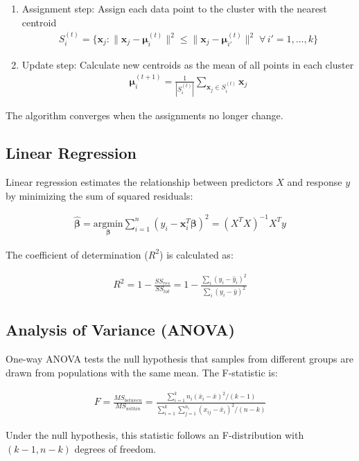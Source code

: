 \documentclass[12pt]{article}
\begin{document}
\begin{enumerate}
    \item Assignment step: Assign each data point to the cluster with the nearest centroid
    \begin{align}
    S_i^{(t)} = \{\mathbf{x}_j : \|\mathbf{x}_j - \boldsymbol{\mu}_i^{(t)}\|^2 \leq \|\mathbf{x}_j - \boldsymbol{\mu}_{i'}^{(t)}\|^2 \; \forall \, i' = 1,\ldots,k\}
    \end{align}
    
    \item Update step: Calculate new centroids as the mean of all points in each cluster
    \begin{align}
    \boldsymbol{\mu}_i^{(t+1)} = \frac{1}{|S_i^{(t)}|} \sum_{\mathbf{x}_j \in S_i^{(t)}} \mathbf{x}_j
    \end{align}
\end{enumerate}

The algorithm converges when the assignments no longer change.

\subsection{Linear Regression}

Linear regression estimates the relationship between predictors $X$ and response $y$ by minimizing the sum of squared residuals:

\begin{align}
\hat{\boldsymbol{\beta}} = \underset{\boldsymbol{\beta}}{\text{argmin}} \sum_{i=1}^{n} (y_i - \mathbf{x}_i^T \boldsymbol{\beta})^2 = (X^T X)^{-1} X^T y
\end{align}

The coefficient of determination ($R^2$) is calculated as:

\begin{align}
R^2 = 1 - \frac{SS_{res}}{SS_{tot}} = 1 - \frac{\sum_i (y_i - \hat{y}_i)^2}{\sum_i (y_i - \bar{y})^2}
\end{align}

\subsection{Analysis of Variance (ANOVA)}

One-way ANOVA tests the null hypothesis that samples from different groups are drawn from populations with the same mean. The F-statistic is:

\begin{align}
F = \frac{MS_{between}}{MS_{within}} = \frac{\sum_{i=1}^{k} n_i(\bar{x}_i - \bar{x})^2 / (k-1)}{\sum_{i=1}^{k}\sum_{j=1}^{n_i} (x_{ij} - \bar{x}_i)^2 / (n-k)}
\end{align}

Under the null hypothesis, this statistic follows an F-distribution with $(k-1, n-k)$ degrees of freedom.
\end{document}
